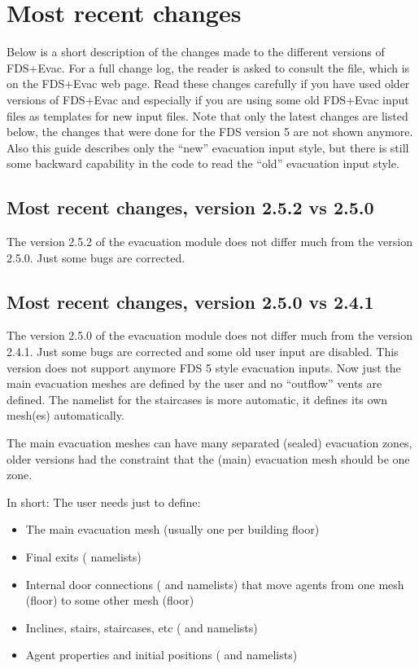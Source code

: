 \documentclass[12pt,a4paper,final,twoside]{stylevk}
\begin{document}
\section{Most recent changes}\label{Sec_RecentChanges}

\noindent Below is a short description of the changes made to the
different versions of FDS+Evac.  For a full change log, the reader is
asked to consult the  file, which is on the FDS+Evac
web page.  Read these changes carefully if you have used older
versions of FDS+Evac and especially if you are using some old FDS+Evac
input files as templates for new input files.  Note that only the
latest changes are listed below, the changes that were done for the
FDS version 5 are not shown anymore.  Also this guide describes only
the ``new'' evacuation input style, but there is still some backward
capability in the code to read the ``old'' evacuation input style.


\subsection{Most recent changes, version 2.5.2 vs
  2.5.0}\label{Sec_252vs250} 

\noindent The version 2.5.2 of the evacuation module does not differ
much from the version 2.5.0.  Just some bugs are corrected.

\subsection{Most recent changes, version 2.5.0 vs
  2.4.1}\label{Sec_250vs241} 

\noindent The version 2.5.0 of the evacuation module does not differ
much from the version 2.4.1.  Just some bugs are corrected and some
old user input are disabled.  This version does not support anymore
FDS 5 style evacuation inputs.  Now just the main evacuation meshes
are defined by the user and no ``outflow'' vents are defined.  The
 namelist for the staircases is more automatic, it defines
its own mesh(es) automatically.

The main evacuation meshes can have many separated (sealed) evacuation
zones, older versions had the constraint that the (main) evacuation
mesh should be one zone.

In short: The user needs just to define:
\begin{itemize}
  \item The main evacuation mesh (usually one per building floor)
  \item Final exits ( namelists)
  \item Internal door connections ( and 
    namelists) that move agents from one mesh (floor) to some other
    mesh (floor)
  \item Inclines, stairs, staircases, etc ( and
     namelists)
  \item Agent properties and initial positions ( and
     namelists)
\end{itemize}
\end{document}
